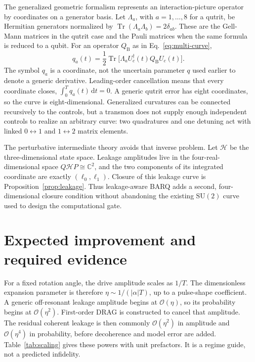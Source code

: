 \documentclass[11pt,a4paper]{article}
\theoremstyle{definition}
\newcommand{\abs}[1]{\lvert #1\rvert}
\newcommand{\Tr}{\operatorname{Tr}}
\newcommand{\dd}{\mathrm{d}}
\newcommand{\order}{\mathcal{O}}
\begin{document}
The generalized geometric formalism represents an interaction-picture operator
by coordinates on a generator basis.  Let \(\Lambda_a\), with
\(a=1,\ldots,8\) for a qutrit, be Hermitian generators normalized by
\(\Tr(\Lambda_a\Lambda_b)=2\delta_{ab}\).  These are the Gell-Mann matrices in
the qutrit case and the Pauli matrices when the same formula is reduced to a
qubit.  For an operator \(Q_{\mathrm{B}}\) as in Eq.~\eqref{eq:multi-curve},
\begin{equation}
  q_a(t)=\frac12\Tr\bigl[\Lambda_a U_c^\dagger(t)Q_{\mathrm{B}}U_c(t)\bigr].
\end{equation}
The symbol \(q_a\) is a coordinate, not the uncertain parameter \(q\) used
earlier to denote a generic derivative.  Leading-order cancellation means that
every coordinate closes, \(\int_0^T q_a(t)\,\dd t=0\).  A generic qutrit error
has eight coordinates, so the curve is eight-dimensional.  Generalized
curvatures can be connected recursively to the controls, but a transmon does
not supply enough independent controls to realize an arbitrary curve: two
quadratures and one detuning act with linked \(0\leftrightarrow1\) and
\(1\leftrightarrow2\) matrix elements.

The perturbative intermediate theory avoids that inverse problem.  Let
\(\mathcal{H}\) be the three-dimensional state space.  Leakage amplitudes live
in the four-real-dimensional space \(Q\mathcal{H}P\cong\mathbb{C}^2\),
and the two components of its integrated coordinate are exactly
\((\ell_0,\ell_1)\).  Closure of this leakage curve is
Proposition~\ref{prop:leakage}.  Thus leakage-aware BARQ adds a second,
four-dimensional closure condition without abandoning the existing
\(\mathrm{SU}(2)\) curve used to design the computational gate.

\section{Expected improvement and required evidence}

For a fixed rotation angle, the drive amplitude scales as \(1/T\).  The
dimensionless expansion parameter is therefore \(\eta\sim 1/(\abs\alpha T)\),
up to a pulse-shape coefficient.  A generic off-resonant leakage amplitude
begins at \(\order(\eta)\), so its probability begins at \(\order(\eta^2)\).
First-order DRAG is constructed to cancel that amplitude.  The residual
coherent leakage is then commonly \(\order(\eta^2)\) in amplitude and
\(\order(\eta^4)\) in probability, before decoherence and model error are
added.  Table~\ref{tab:scaling} gives these powers with unit prefactors.  It
is a regime guide, not a predicted infidelity.
\end{document}
